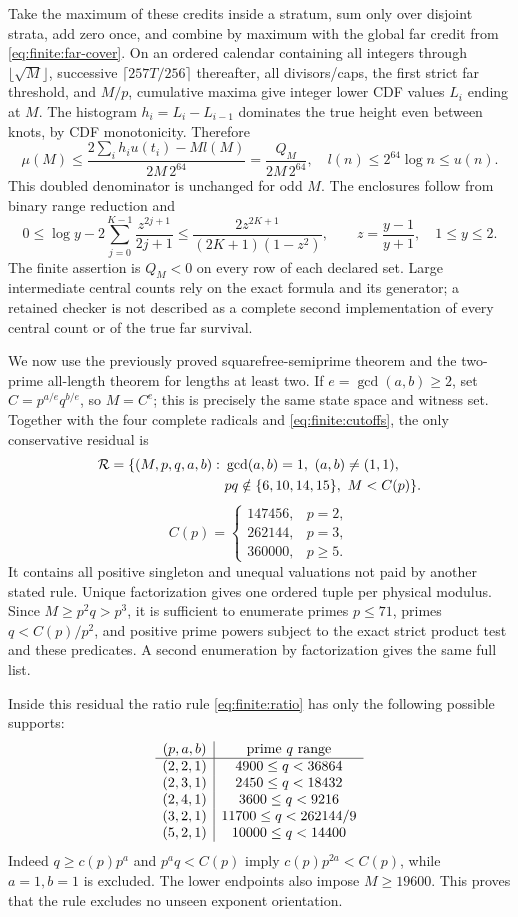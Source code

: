 \documentclass[11pt]{article}
\theoremstyle{definition}\newtheorem{definition}[theorem]{Definition}
\theoremstyle{remark}\newtheorem{remark}[theorem]{Remark}
\begin{document}
Take the maximum of these credits inside a stratum, sum only over
disjoint strata, add zero once, and combine by maximum with the
global far credit from \eqref{eq:finite:far-cover}.
On an ordered calendar containing all integers through \(\lfloor\sqrt M\rfloor\),
successive \(\lceil257T/256\rceil\) thereafter, all divisors/caps,
the first strict far threshold, and \(M/p\), cumulative maxima give
integer lower CDF values \(L_i\) ending at \(M\).
The histogram \(h_i=L_i-L_{i-1}\) dominates the true height even
between knots, by CDF monotonicity.  Therefore
\[
 \mu(M)\le
 \frac{2\sum_i h_i u(t_i)-M l(M)}{2M\,2^{64}}
 =\frac{Q_M}{2M\,2^{64}},
 \quad l(n)\le2^{64}\log n\le u(n).
\]
This doubled denominator is unchanged for odd \(M\).
The enclosures follow from binary range reduction and
\[
 0\le\log y-2\sum_{j=0}^{K-1}\frac{z^{2j+1}}{2j+1}
 \le\frac{2z^{2K+1}}{(2K+1)(1-z^2)},\qquad z=\frac{y-1}{y+1},
 \quad1\le y\le2 .
\]
The finite assertion is \(Q_M<0\) on every row of each declared set.
Large intermediate central counts rely on the exact formula and its
generator; a retained checker is not described as a complete second
implementation of every central count or of the true far survival.

We now use the previously proved squarefree-semiprime theorem and the
two-prime all-length theorem for lengths at least two.
If \(e=\gcd(a,b)\ge2\), set \(C=p^{a/e}q^{b/e}\), so \(M=C^e\);
this is precisely the same state space and witness set.
Together with the four complete radicals and \eqref{eq:finite:cutoffs},
the only conservative residual is
\[
 \begin{split}
 {\cal R}=\{(M,p,q,a,b):\ &\gcd(a,b)=1,\ (a,b)\ne(1,1),\\
 &pq\notin\{6,10,14,15\},\ M<C(p)\}.
 \end{split}
\]
\[
 C(p)=\begin{cases}
147456,&p=2,\\262144,&p=3,\\360000,&p\ge5 .
\end{cases}
\]
It contains all positive singleton and unequal valuations not paid by
another stated rule.  Unique factorization gives one ordered tuple
per physical modulus.  Since \(M\ge p^2q>p^3\), it is sufficient
to enumerate primes \(p\le71\), primes \(q<C(p)/p^2\), and positive
prime powers subject to the exact strict product test and these predicates.
A second enumeration by factorization gives the same full list.

Inside this residual the ratio rule \eqref{eq:finite:ratio} has only the
following possible supports:
\[
\begin{array}{c|c}
(p,a,b)&\hbox{prime }q\hbox{ range}\\ \hline
(2,2,1)&4900\le q<36864\\
(2,3,1)&2450\le q<18432\\
(2,4,1)&3600\le q<9216\\
(3,2,1)&11700\le q<262144/9\\
(5,2,1)&10000\le q<14400
\end{array}
\]
Indeed \(q\ge c(p)p^a\) and \(p^aq<C(p)\) imply
\(c(p)p^{2a}<C(p)\), while \(a=1,b=1\) is excluded.
The lower endpoints also impose \(M\ge19600\).
This proves that the rule excludes no unseen exponent orientation.
\end{document}
